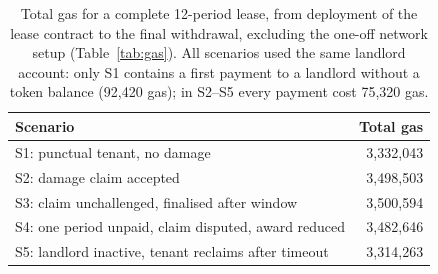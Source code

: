 \begin{table}[t]
\centering
\small
\caption{Total gas for a complete 12-period lease, from deployment of the lease contract to the final withdrawal, excluding the one-off network setup (Table~\ref{tab:gas}). All scenarios used the same landlord account: only S1 contains a first payment to a landlord without a token balance (92{,}420 gas); in S2--S5 every payment cost 75{,}320 gas.}
\label{tab:lifecycle}
\begin{tabular}{@{}lr@{}}
\toprule
Scenario & Total gas \\
\midrule
S1: punctual tenant{,} no damage & 3{,}332{,}043 \\
S2: damage claim accepted & 3{,}498{,}503 \\
S3: claim unchallenged{,} finalised after window & 3{,}500{,}594 \\
S4: one period unpaid{,} claim disputed{,} award reduced & 3{,}482{,}646 \\
S5: landlord inactive{,} tenant reclaims after timeout & 3{,}314{,}263 \\
\bottomrule
\end{tabular}
\end{table}
